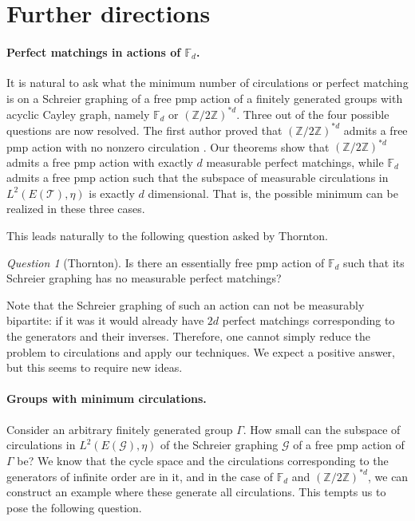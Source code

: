 \documentclass[10pt]{article}
\theoremstyle{plain}
\theoremstyle{remark}
\newtheorem{question}[lemma]{Question}
\newcommand{\1}{\mathbbm{1}}
\newcommand{\Z}{\mathbb{Z}}
\newcommand{\mcT}{\mathcal{T}}
\numberwithin{equation}{section}
\begin{document}
\section{Further directions}\label{sec:further_directions}


\paragraph{Perfect matchings in actions of $\mathbb{F}_d$.} It is natural to ask what the minimum number of circulations or perfect matching is on a Schreier graphing of a free pmp action of a finitely generated groups with acyclic Cayley graph, namely $\mathbb{F}_d$ or $(\Z / 2\Z)^{*d}$. Three out of the four possible questions are now resolved. The first author proved that $(\Z / 2\Z)^{*d}$ admits a free pmp action with no nonzero circulation \cite{kun2021measurable}. Our theorems show that $(\Z / 2\Z)^{*d}$ admits a free pmp action with exactly $d$ measurable perfect matchings, while $\mathbb{F}_d$ admits a free pmp action such that the subspace of measurable circulations in $L^2(E(\mcT),\eta)$ is exactly $d$ dimensional. That is, the possible minimum can be realized in these three cases.

This leads naturally to the following question asked by Thornton. 

\begin{question}[Thornton]
Is there an essentially free pmp action of $\mathbb{F}_d$ such that its Schreier graphing has no measurable perfect matchings?
\end{question}

Note that the Schreier graphing of such an action can not be measurably bipartite: if it was it would already have $2d$ perfect matchings corresponding to the generators and their inverses. Therefore, one cannot simply reduce the problem to circulations and apply our techniques. We expect a positive answer, but this seems to require new ideas.

\paragraph{Groups with minimum circulations.} Consider an arbitrary finitely generated group $\Gamma$. How small can the subspace of circulations in $L^2(E(\mathcal{G}),\eta)$ of the Schreier graphing $\mathcal{G}$ of a free pmp action of $\Gamma$ be?
We know that the cycle space and the circulations corresponding to the generators of infinite order are in it, and in the case of $\mathbb{F}_d$ and $(\Z / 2\Z)^{*d}$, we can construct an example where these generate all circulations. This tempts us to pose the following question.
\end{document}
